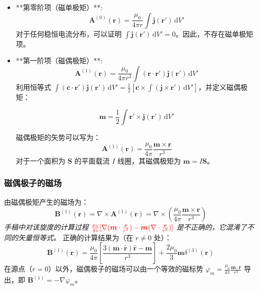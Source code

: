 \documentclass[fontset=none]{ctexart}
\begin{document}
\begin{itemize}
    \item **第零阶项（磁单极矩）**:
    \begin{equation}
        \bm{A}^{(0)}(\bm{r}) = \frac{\mu_0}{4\pi r} \int \bm{j}(\bm{r'}) \, \mathrm{d}V'
    \end{equation}
    对于任何稳恒电流分布，可以证明 $\int \bm{j}(\bm{r'}) \, \mathrm{d}V' = 0$。因此，不存在磁单极矩项。
    
    \item **第一阶项（磁偶极矩）**:
    \begin{equation}
        \bm{A}^{(1)}(\bm{r}) = \frac{\mu_0}{4\pi r^3} \int (\bm{r} \cdot \bm{r'}) \bm{j}(\bm{r'}) \, \mathrm{d}V'
    \end{equation}
    利用恒等式 $\int (\bm{c} \cdot \bm{r'}) \bm{j}(\bm{r'}) \, \mathrm{d}V' = \frac{1}{2} \left[ \bm{c} \times \int (\bm{j} \times \bm{r'}) \, \mathrm{d}V' \right]$，并定义磁偶极矩：
    \begin{definition}[磁偶极矩]
    \begin{equation}
        \bm{m} = \frac{1}{2} \int \bm{r'} \times \bm{j}(\bm{r'}) \, \mathrm{d}V'
    \end{equation}
    \end{definition}
    磁偶极矩的矢势可以写为：
    \begin{equation}
        \bm{A}^{(1)}(\bm{r}) = \frac{\mu_0}{4\pi} \frac{\bm{m} \times \bm{r}}{r^3}
    \end{equation}
    对于一个面积为 $\bm{S}$ 的平面载流 $I$ 线圈，其磁偶极矩为 $\bm{m} = I\bm{S}$。
\end{itemize}

\subsubsection{磁偶极子的磁场}
由磁偶极矩产生的磁场为：
\begin{equation}
    \bm{B}^{(1)}(\bm{r}) = \nabla \times \bm{A}^{(1)}(\bm{r}) = \nabla \times \left( \frac{\mu_0}{4\pi} \frac{\bm{m} \times \bm{r}}{r^3} \right)
\end{equation}
\textit{手稿中对该旋度的计算过程 $\textcolor{red}{\frac{\mu_0}{4\pi}[\nabla(\bm{m} \cdot \frac{\bm{r}}{r^3}) - \bm{m}(\nabla \cdot \frac{\bm{r}}{r^3})]}$ 是不正确的，它混淆了不同的矢量恒等式。}
正确的计算结果为（在 $r \ne 0$ 处）：
\begin{equation}
    \bm{B}^{(1)}(\bm{r}) = \frac{\mu_0}{4\pi} \left[ \frac{3(\bm{m} \cdot \bm{\hat{r}})\bm{\hat{r}} - \bm{m}}{r^3} \right] + \frac{2\mu_0}{3}\bm{m}\delta^{(3)}(\bm{r})
\end{equation}
在源点（$r=0$）以外，磁偶极子的磁场可以由一个等效的磁标势 $\varphi_m = \frac{\mu_0}{4\pi} \frac{\bm{m}\cdot\bm{r}}{r^3}$ 导出，即 $\bm{B}^{(1)} = -\nabla \varphi_m$。
\end{document}
